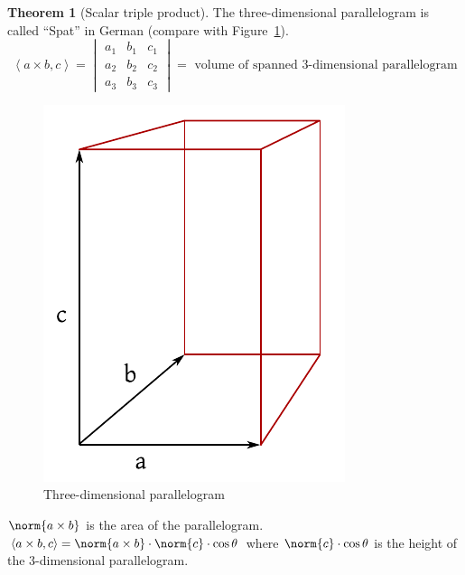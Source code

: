 \documentclass[a4paper,landscape,twocolumn]{article}
\newcommand\functional[1]{\left\langle{#1}\right\rangle}
\theoremstyle{definition}
\newtheorem{theorem}{Theorem}
\DeclarePairedDelimiter\norm\lVert\rVert
\begin{document}
\begin{theorem}[Scalar triple product]
  \label{satz-8.11}
  The three-dimensional parallelogram is called \enquote{Spat} in German (compare with Figure~\ref{img:3dp}).
  \[
    \functional{a\times b, c}
    = \begin{vmatrix}
      a_1 & b_1 & c_1 \\
      a_2 & b_2 & c_2 \\
      a_3 & b_3 & c_3
    \end{vmatrix}
    = \text{ volume of spanned 3-dimensional parallelogram}
  \]
  \begin{figure}[!h]
    \begin{center}
      \includegraphics{img/scalar-triple-product.pdf}
      \caption{Three-dimensional parallelogram}
      \label{img:3dp}
    \end{center}
  \end{figure}
  $\norm{a \times b}$ is the area of the parallelogram.
  $\functional{a \times b, c} = \norm{a \times b} \cdot \norm{c} \cdot \cos\theta$
  where $\norm{c} \cdot \cos\theta$ is the height of the $3$-dimensional parallelogram.


\end{theorem}
\end{document}

